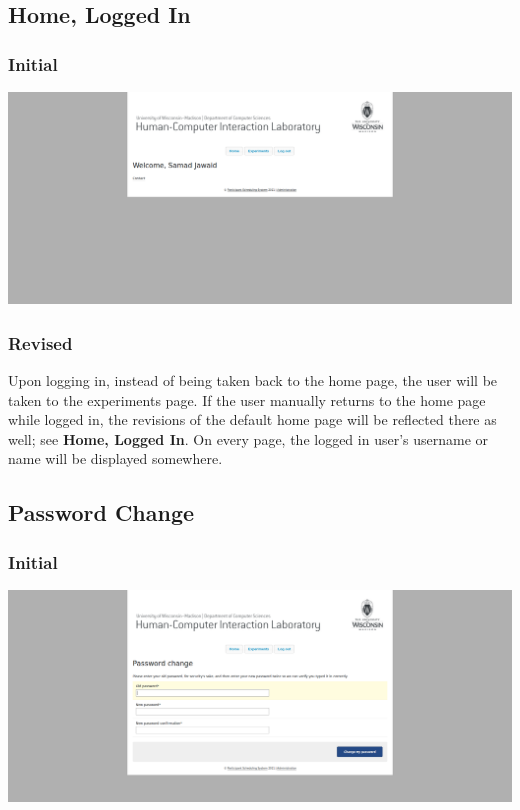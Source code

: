 \subsection{Home, Logged In}
\subsubsection{Initial}
\includegraphics[width=6in]{../other/initial-interface-design/home-2.png}
\subsubsection{Revised}
Upon logging in, instead of being taken back to the home page, the user will be taken to the experiments page. If the user manually returns to the home page while logged in, the revisions of the default home page will be reflected there as well; see {\bf Home, Logged In}. On every page, the logged in user's username or name will be displayed somewhere.

\subsection{Password Change}
\subsubsection{Initial}
\includegraphics[width=6in]{../other/initial-interface-design/password-change.png}
